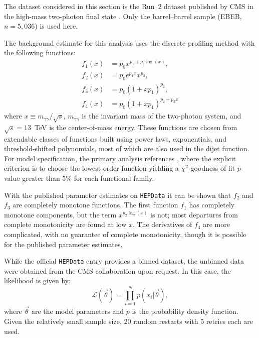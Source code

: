 \documentclass[a4paper,11pt]{article}
\begin{document}
The dataset considered in this section is the Run~2 dataset published by CMS in the high-mass two-photon final state \cite{CMS_high_mass_diphoton}.
Only the barrel--barrel sample (EBEB, $n=5,036$) is used here.

The background estimate for this analysis uses the discrete profiling method with the following 
functions:
 \begin{subequations}\label{eq:diphoton_fns}
\begin{align}
    f_1(x)&=p_0x^{p_1+p_2\log(x)}, \label{eq:diphoton_f1} \\
    f_2(x)&=p_0e^{p_1x}x^{p_2}, \label{eq:diphoton_f2} \\
    f_3(x)&=p_0(1+xp_1)^{p_2}, \label{eq:diphoton_f3} \\
    f_4(x)&=p_0(1+xp_1)^{p_2+p_3x} \label{eq:diphoton_f4}
\end{align}
\end{subequations}
where $x\equiv m_{\gamma\gamma}/\sqrt{s}$, $m_{\gamma\gamma}$ is the invariant mass of the 
two-photon system, and $\sqrt{s}=13$~TeV is the center-of-mass energy.
These functions are chosen from extendable classes of functions built using power laws, exponentials, and threshold-shifted polynomials, most of which are also used in the dijet function. For model specification, the primary analysis references \cite{CMS_DP1}, where the explicit criterion is to choose the lowest-order function yielding a $\chi^2$ goodness-of-fit $p$-value greater than 5\% for each functional family.

With the published parameter estimates on \texttt{HEPData} it can be shown that $f_2$ and $f_3$ are completely monotone functions.
The first function $f_1$ has completely monotone components, but the term $x^{p_2 \log(x)}$ is not; most departures from complete monotonicity are found at low $x$. The derivatives of $f_4$ are more complicated, with no guarantee of complete monotonicity, though it is possible for the published parameter estimates.

While the official \texttt{HEPData} entry provides a binned dataset, the unbinned data were 
obtained from the CMS collaboration upon request.
In this case, the likelihood is given by:
\begin{equation}
    \mathcal{L}(\vec\theta) = \prod_{i=1}^N p(x_i|\vec\theta),
\end{equation}
where $\vec\theta$ are the model parameters and $p$ is the probability density function. 
Given the relatively small sample size, 20 random restarts with 5 retries each are used. 
\end{document}
